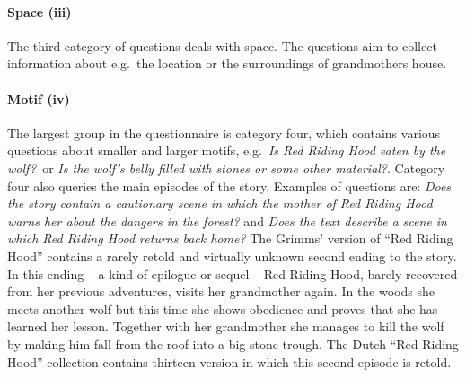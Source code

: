 \vspace{\abovedisplayskip}
\begin{minipage}[c]{\textwidth}
\begin{Parallel}[c]{0.5\textwidth}{0.5\textwidth}
{\small
{}

}
\end{Parallel}
\end{minipage}

\vspace{\belowdisplayskip}
\paragraph{Space (iii)} The third category of questions deals with space. The questions aim to collect information about e.g.\ the location or the surroundings of grandmothers house. 

\paragraph{Motif (iv)} The largest group in the questionnaire is category four, which contains various questions about smaller and larger motifs, e.g.\ \emph{Is Red Riding Hood eaten by the wolf?}\ or \emph{Is the wolf's belly filled with stones or some other material?}. Category four also queries the main episodes of the story. Examples of questions are: \emph{Does the story contain a cautionary scene in which the mother of Red Riding Hood warns her about the dangers in the forest?} and \emph{Does the text describe a scene in which Red Riding Hood returns back home?} The Grimms' version of ``Red Riding Hood'' contains a rarely retold and virtually unknown second ending to the story. In this ending -- a kind of epilogue or sequel -- Red Riding Hood, barely recovered from her previous adventures, visits her grandmother again. In the woods she meets another wolf but this time she shows obedience and proves that she has learned her lesson. Together with her grandmother she manages to kill the wolf by making him fall from the roof into a big stone trough. The Dutch ``Red Riding Hood'' collection contains thirteen version in which this second episode is retold.


